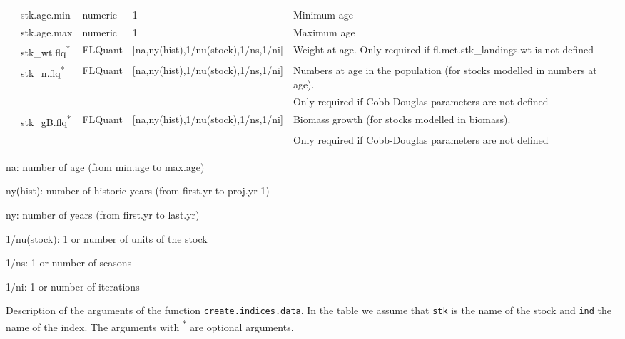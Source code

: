 \begin{landscape}
\begin{table}[!ht]
\begin{footnotesize}
\begin{threeparttable}
\begin{tabular}{lllll}
          & stk.age.min &	numeric &	1 &	Minimum age\\ 
          & stk.age.max &	numeric &	1 &	Maximum age\\
          & stk\_wt.flq\textsuperscript{*} & FLQuant & [na,ny(hist),1/nu(stock),1/ns,1/ni] & Weight at age. Only required if fl.met.stk\_landings.wt is not defined\\
          & stk\_n.flq\textsuperscript{*}  & FLQuant & [na,ny(hist),1/nu(stock),1/ns,1/ni] & Numbers at age in the population (for stocks modelled in numbers at age).\\
          & & & & Only required if Cobb-Douglas parameters are not defined\\
          & stk\_gB.flq\textsuperscript{*} & FLQuant & [na,ny(hist),1/nu(stock),1/ns,1/ni] & Biomass growth (for stocks modelled in biomass).\\
          & & & & Only required if Cobb-Douglas parameters are not defined\\
        \hline
      \end{tabular}
      
      \begin{tablenotes}
        \item na: number of age (from min.age to max.age)
        \item ny(hist): number of historic years (from first.yr to proj.yr-1)
        \item ny: number of years (from first.yr to last.yr)
        \item 1/nu(stock): 1 or number of units of the stock
        \item 1/ns: 1 or number of seasons
        \item 1/ni:  1 or number of iterations
      \end{tablenotes}
      
    \end{threeparttable}
  \end{footnotesize}

\end{table}	



\begin{table}[!ht]

  \centering
  \begin{footnotesize}
    
    \caption{Description of the arguments of the function \texttt{create.indices.data}. 
      In the table we assume that \texttt{stk} is the name of the stock and \texttt{ind} the name of the index. 
      The arguments with \textsuperscript{*} are optional arguments.}
    

\end{footnotesize}
\end{table}
\end{landscape}
